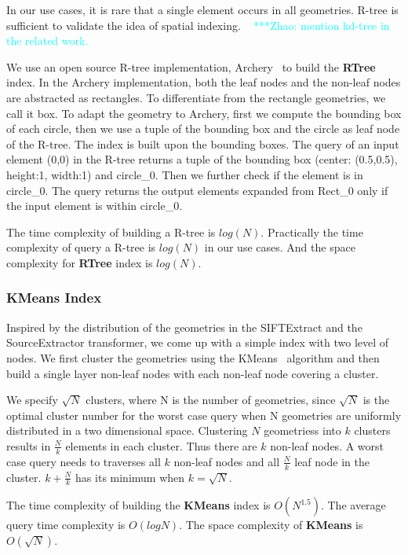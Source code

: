 \documentclass{sig-alternate}
\newcommand{\zhaonote}[1]{{\textcolor{cyan}    { ***Zhao:      #1 }}}
\newcommand{\zhaonote}[1]{}
\begin{document}
In our use cases, it is rare that a single element occurs in all geometries. 
R-tree is sufficient to validate the idea of spatial indexing.
~\zhaonote{mention kd-tree in the related work.}

We use an open source R-tree implementation, Archery~\cite{osheim13} to build the {\bf RTree} index.
In the Archery implementation, both the leaf nodes and the non-leaf nodes are abstracted as rectangles.
To differentiate from the rectangle geometries, we call it box.
To adapt the geometry to Archery, first we compute the bounding box of each circle, then we use
a tuple of the bounding box and the circle as leaf node of the R-tree. 
The index is built upon the bounding boxes. 
The query of an input element (0,0) in the R-tree returns a tuple of the bounding box (center: (0.5,0.5), height:1, width:1) and circle\_0.
Then we further check if the element is in circle\_0. 
The query returns the output elements expanded from Rect\_0 only if the input element is within circle\_0.

The time complexity of building a R-tree is $log(N)$.
Practically the time complexity of query a R-tree is $log(N)$ in our use cases.
And the space complexity for {\bf RTree} index is $log(N)$.

\subsubsection{KMeans Index}
Inspired by the distribution of the geometries in the SIFTExtract and the SourceExtractor transformer,
we come up with a simple index with two level of nodes.
We first cluster the geometries using the KMeans~\cite{macqueen67} algorithm 
and then build a single layer non-leaf nodes with each non-leaf node covering a cluster.

We specify $\sqrt{N}$ clusters, where N is the number of geometries, 
since $\sqrt{N}$ is the optimal cluster number for the worst case query when N geometries are uniformly distributed in a two dimensional space.
Clustering $N$ geometriess into $k$ clusters results in $\frac{N}{k}$ elements in each cluster. 
Thus there are $k$ non-leaf nodes.
A worst case query needs to traverses all $k$ non-leaf nodes and all $\frac{N}{k}$ leaf node in the cluster.
$k+\frac{N}{k}$ has its minimum when $k=\sqrt{N}$. 

The time complexity of building the {\bf KMeans} index is $O(N^{1.5})$.
The average query time complexity is $O(logN)$.
The space complexity of {\bf KMeans} is $O(\sqrt{N})$.
\end{document}
